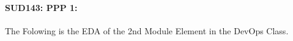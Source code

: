 \documentclass[12pt]{extreport}
\begin{document}
\begin{comment}
\subparagraph{Interpretation of the Box-plots:}
For This Element 

\begin{enumerate}	
	\item The MP Class Box-Plot:
	\begin{enumerate}
		\item MAX = a {} {} {} {} {} {} {} {} UQ = b {} {} {} {} {} {} {} {} Median = c
		\item LQ = d {} {} {} {} {} {} {} {}  MIN =	l {} {} {} {} {} {} {} {}  IQR = e - f = g
	\end{enumerate}
	\item The PSI Class Box-Plot:
	\begin{enumerate}
		\item MAX = a {} {} {} {} {} {} {} {} UQ = b {} {} {} {} {} {} {} {} Median = c
		\item LQ = d {} {} {} {} {} {} {} {}  MIN =	e {} {} {} {} {} {} {} {} IQR = f - g = h	
	\end{enumerate}
	\item The TSI Class Box-Plot:
	\begin{enumerate}
		\item MAX = a {} {} {} {} {} {} {} {} UQ = b {} {} {} {} {} {} {} {} Median = c
		\item LQ = d {} {} {} {} {} {} {} {} MIN = e {} {} {} {} {} {} {} {} IQR = f - g = h	
	\end{enumerate}
\end{enumerate}

\subparagraph{Interpretation of the histogram:}
This Frequency Distribution is (Skeness) with the following descriptive statistics:
\begin{enumerate}
	\item Mean = 
	\item STD = 
	\item Range = a - b = c
	\item IQR = a-b = c 
\end{enumerate}
\end{comment}



\paragraph{\large SUD143: PPP 1:\\
 }
The Folowing is the EDA of the 2nd Module Element in the DevOps Class. 
\end{document}
